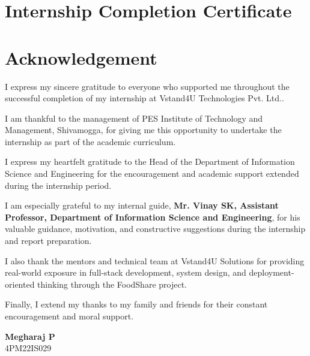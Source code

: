 \documentclass[12pt,a4paper]{report}
\newcommand{\studentname}{Megharaj P}
\newcommand{\usn}{4PM22IS029}
\newcommand{\branch}{Information Science and Engineering}
\newcommand{\internalguide}{Vinay SK}
\newcommand{\companyname}{Vstand4U Technologies Pvt. Ltd.}
\newcommand{\companybrand}{Vstand4U Solutions}
\newcommand{\projecttitle}{FoodShare}
\begin{document}
\clearpage
\chapter*{Internship Completion Certificate}
\begin{center}
\vspace*{2cm}
\vfill
\end{center}

\clearpage
\chapter*{Acknowledgement}

I express my sincere gratitude to everyone who supported me throughout the successful completion of my internship at \companyname.

I am thankful to the management of PES Institute of Technology and Management, Shivamogga, for giving me this opportunity to undertake the internship as part of the academic curriculum.

I express my heartfelt gratitude to the Head of the Department of \branch{} for the encouragement and academic support extended during the internship period.

I am especially grateful to my internal guide, \textbf{Mr. \internalguide, Assistant Professor, Department of Information Science and Engineering}, for his valuable guidance, motivation, and constructive suggestions during the internship and report preparation.

I also thank the mentors and technical team at \companybrand{} for providing real-world exposure in full-stack development, system design, and deployment-oriented thinking through the \projecttitle{} project.

Finally, I extend my thanks to my family and friends for their constant encouragement and moral support.

\vspace{1cm}
\begin{flushright}
\textbf{\studentname}\\
\usn
\end{flushright}
\end{document}
